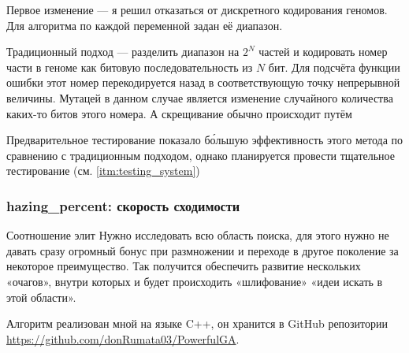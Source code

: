 Первое изменение — я решил отказаться от дискретного кодирования геномов.
Для алгоритма по каждой переменной задан её диапазон.

Традиционный подход — разделить диапазон на $2^N$ частей и кодировать номер части в геноме как битовую последовательность из $N$ бит.
Для подсчёта функции ошибки этот номер перекодируется назад в соответствующую точку непрерывной величины.
Мутацей в данном случае является изменение случайного количества каких-то битов этого номера.
А скрещивание обычно происходит путём

Предварительное тестирование показало бо́льшую эффективность этого метода по сравнению с традиционным подходом, однако планируется провести тщательное тестирование (см. \ref{itm:testing_system})

\subsubsection{hazing\_percent: скорость сходимости}\label{subsubsec:hazing}
Соотношение элит
Нужно исследовать всю область поиска, для этого нужно не давать сразу огромный бонус при размножении и переходе в другое поколение за некоторое преимущество.
Так получится обеспечить развитие нескольких «очагов», внутри которых и будет происходить «шлифование» «идеи искать в этой области».

Алгоритм реализован мной на языке C++, он хранится в GitHub репозитории \href{https://github.com/donRumata03/PowerfulGA}{https://github.com/donRumata03/PowerfulGA}.